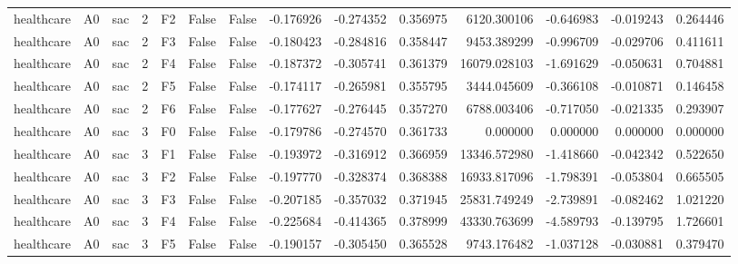 \begin{tabular}{lllrlllrrrrrrr}
healthcare &      A0 &       sac &     2 &  F2 &           False &            False & -0.176926 & -0.274352 & 0.356975 &      6120.300106 &          -0.646983 &       -0.019243 &            0.264446 \\
healthcare &      A0 &       sac &     2 &  F3 &           False &            False & -0.180423 & -0.284816 & 0.358447 &      9453.389299 &          -0.996709 &       -0.029706 &            0.411611 \\
healthcare &      A0 &       sac &     2 &  F4 &           False &            False & -0.187372 & -0.305741 & 0.361379 &     16079.028103 &          -1.691629 &       -0.050631 &            0.704881 \\
healthcare &      A0 &       sac &     2 &  F5 &           False &            False & -0.174117 & -0.265981 & 0.355795 &      3444.045609 &          -0.366108 &       -0.010871 &            0.146458 \\
healthcare &      A0 &       sac &     2 &  F6 &           False &            False & -0.177627 & -0.276445 & 0.357270 &      6788.003406 &          -0.717050 &       -0.021335 &            0.293907 \\
healthcare &      A0 &       sac &     3 &  F0 &           False &            False & -0.179786 & -0.274570 & 0.361733 &         0.000000 &           0.000000 &        0.000000 &            0.000000 \\
healthcare &      A0 &       sac &     3 &  F1 &           False &            False & -0.193972 & -0.316912 & 0.366959 &     13346.572980 &          -1.418660 &       -0.042342 &            0.522650 \\
healthcare &      A0 &       sac &     3 &  F2 &           False &            False & -0.197770 & -0.328374 & 0.368388 &     16933.817096 &          -1.798391 &       -0.053804 &            0.665505 \\
healthcare &      A0 &       sac &     3 &  F3 &           False &            False & -0.207185 & -0.357032 & 0.371945 &     25831.749249 &          -2.739891 &       -0.082462 &            1.021220 \\
healthcare &      A0 &       sac &     3 &  F4 &           False &            False & -0.225684 & -0.414365 & 0.378999 &     43330.763699 &          -4.589793 &       -0.139795 &            1.726601 \\
healthcare &      A0 &       sac &     3 &  F5 &           False &            False & -0.190157 & -0.305450 & 0.365528 &      9743.176482 &          -1.037128 &       -0.030881 &            0.379470 \\

\end{tabular}
